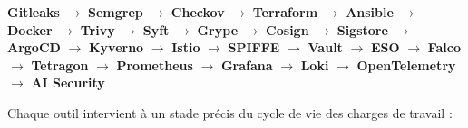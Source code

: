 \begin{center}
\small
\textbf{Gitleaks} $\rightarrow$ \textbf{Semgrep} $\rightarrow$ \textbf{Checkov} $\rightarrow$ \textbf{Terraform} $\rightarrow$ \textbf{Ansible} $\rightarrow$ \textbf{Docker} $\rightarrow$ \textbf{Trivy} $\rightarrow$ \textbf{Syft} $\rightarrow$ \textbf{Grype} $\rightarrow$ \textbf{Cosign} $\rightarrow$ \textbf{Sigstore} $\rightarrow$ \textbf{ArgoCD} $\rightarrow$ \textbf{Kyverno} $\rightarrow$ \textbf{Istio} $\rightarrow$ \textbf{SPIFFE} $\rightarrow$ \textbf{Vault} $\rightarrow$ \textbf{ESO} $\rightarrow$ \textbf{Falco} $\rightarrow$ \textbf{Tetragon} $\rightarrow$ \textbf{Prometheus} $\rightarrow$ \textbf{Grafana} $\rightarrow$ \textbf{Loki} $\rightarrow$ \textbf{OpenTelemetry} $\rightarrow$ \textbf{AI Security}
\end{center}

Chaque outil intervient à un stade précis du cycle de vie des charges de travail :

